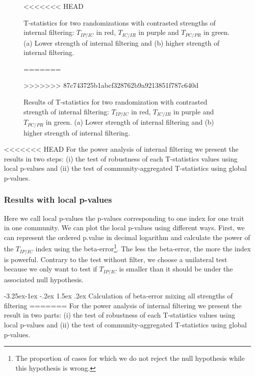 \documentclass[12pt]{article}\usepackage[]{graphicx}\usepackage[]{color}
\makeatletter
\newenvironment{knitrout}{}{} %
\newcounter {subsubsubsection}[subsubsection]
\newcommand\subsubsubsection{\@startsection{subsubsubsection}{4}{\z@}%
          {-3.25ex\@plus -1ex \@minus -.2ex}%
          {1.5ex \@plus .2ex}%
          {\normalfont\normalsize\bfseries}}
\makeatother
\begin{document}
\begin{landscape}
\begin{knitrout}
\begin{figure}
{}

<<<<<<< HEAD
\caption[T-statistics for two randomizations with contrasted strengths of internal filtering]{T-statistics for two randomizations with contrasted strengths of internal filtering: $T_{IP/IC}$ in red, $T_{IC/IR}$ in purple and $T_{PC/PR}$ in green. (a) Lower strength of internal filtering and (b) higher strength of internal filtering.}\label{fig:typical_result_internal_filtering2}
=======
\caption[Results of T-statistics for two randomization with contrasted strength of internal filtering]{Results of T-statistics for two randomization with contrasted strength of internal filtering: $T_{IP/IC}$ in red, $T_{IC/IR}$ in purple and $T_{PC/PR}$ in green. (a) Lower strength of internal filtering and (b) higher strength of internal filtering.}\label{fig:typical_result_internal_filtering2}
>>>>>>> 87c743725b1abcf328762b9a9213851f787c640d
\end{figure}


\end{knitrout}

<<<<<<< HEAD
For the power analysis of internal filtering we present the results in two steps: (i) the test of robustness of each T-statistics values using local p-values and (ii) the test of community-aggregated T-statistics using global p-values.

 \subsubsection {Results with local p-values}

Here we call local p-values the p-values corresponding to one index for one trait in one community. We can plot the local p-values using different ways. First, we can represent the ordered p.value in decimal logarithm and calculate the power of the $T_{IP/IC}$ index using the beta-error\footnote{The proportion of cases for which we do not reject the null hypothesis while this hypothesis is wrong.}. The less the beta-error, the more the index is powerful. Contrary to the test without filter, we choose a unilateral test because we only want to test if $T_{IP/IC}$ is smaller than it should be under the associated null hypothesis.


  \subsubsubsection {Calculation of beta-error mixing all strengths of filtering}
=======
For the power analysis of internal filtering we present the result in two parts: (i) the test of robustness of each T-statistics values using local p-values and (ii) the test of community-aggregated T-statistics using global p-values.


\end{landscape}
\end{document}
